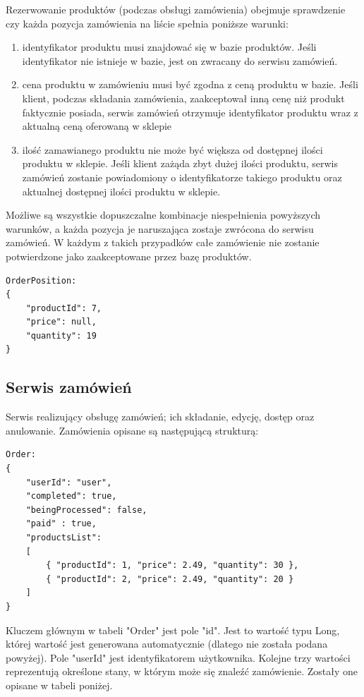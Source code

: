 \documentclass[11pt,a4paper,twoside]{article}
\begin{document}
Rezerwowanie produktów (podczas obsługi zamówienia) obejmuje sprawdzenie czy każda pozycja zamówienia na liście spełnia poniższe warunki:
\begin{enumerate}
\item identyfikator produktu musi znajdować się w bazie produktów. Jeśli identyfikator nie istnieje w bazie, jest on zwracany do serwisu zamówień.
\item cena produktu w zamówieniu musi być zgodna z ceną produktu w bazie. Jeśli klient, podczas składania zamówienia, zaakceptował inną cenę niż produkt faktycznie posiada, serwis zamówień otrzymuje identyfikator produktu wraz z aktualną ceną oferowaną w sklepie
\item ilość zamawianego produktu nie może być większa od dostępnej ilości produktu w sklepie. Jeśli klient zażąda zbyt dużej ilości produktu, serwis zamówień zostanie powiadomiony o identyfikatorze takiego produktu oraz aktualnej dostępnej ilości produktu w sklepie.
\end{enumerate}

Możliwe są wszystkie dopuszczalne kombinacje niespełnienia powyższych warunków, a każda pozycja je naruszająca zostaje zwrócona do serwisu zamówień. W każdym z takich przypadków całe zamówienie nie zostanie potwierdzone jako zaakceptowane przez bazę produktów.

\begin{lstlisting}
OrderPosition:
{
	"productId": 7,
    "price": null,
    "quantity": 19
}
\end{lstlisting}
\vspace{-20pt}
\subsection{Serwis zamówień}
Serwis realizujący obsługę zamówień; ich składanie, edycję, dostęp oraz anulowanie. Zamówienia opisane są następującą strukturą:

\begin{lstlisting}
Order:
{
    "userId": "user",
    "completed": true,
    "beingProcessed": false,
    "paid" : true,
    "productsList": 
    [
    	{ "productId": 1, "price": 2.49, "quantity": 30 },
        { "productId": 2, "price": 2.49, "quantity": 20 }			
    ]
}
\end{lstlisting}
\vspace{-20pt}
Kluczem głównym w tabeli "Order" jest pole "id". Jest to wartość typu Long, której wartość jest generowana automatycznie (dlatego nie została podana powyżej). Pole "userId" jest identyfikatorem użytkownika. Kolejne trzy wartości reprezentują określone stany, w którym może się znaleźć zamówienie. Zostały one opisane w tabeli poniżej. 
\end{document}
